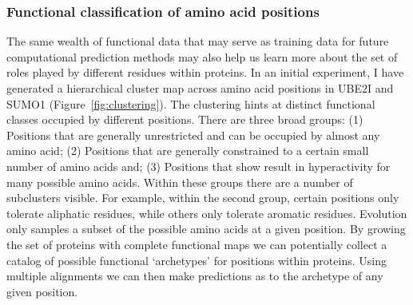 \subsubsection{Functional classification of amino acid positions}
The same wealth of functional data that may serve as training data for future computational prediction methods may also help us learn more about the set of roles played by different residues within proteins. In an initial experiment, I have generated a hierarchical cluster map across amino acid positions in UBE2I and SUMO1 (Figure~\ref{fig:clustering}). The clustering hints at distinct functional classes occupied by different positions. There are three broad groups: (1) Positions that are generally unrestricted and can be occupied by almost any amino acid; (2) Positions that are generally constrained to a certain small number of amino acids and; (3) Positions that show result in hyperactivity for many possible amino acids. Within these groups there are a number of subclusters visible. For example, within the second group, certain positions only tolerate aliphatic residues, while others only tolerate aromatic residues. Evolution only samples a subset of the possible amino acids at a given position. By growing the set of proteins with complete functional maps we can potentially collect a catalog of possible functional `archetypes' for positions within proteins. Using multiple alignments we can then make predictions as to the archetype of any given position.
